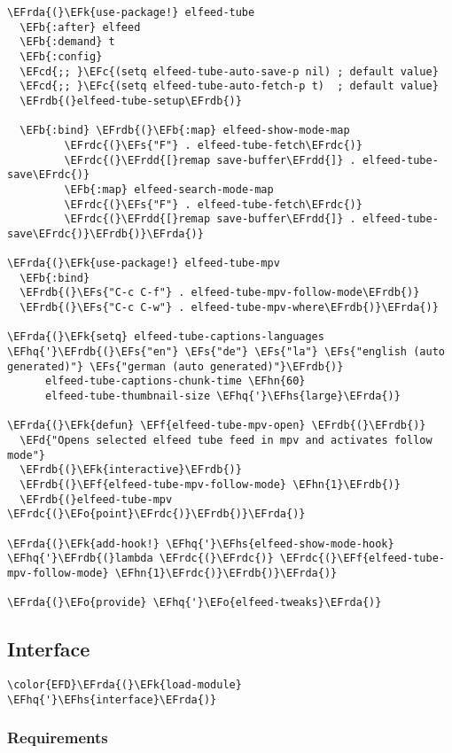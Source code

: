 \documentclass[a4wide,10pt]{article}
\newcommand{\EFc}[1]{\textcolor{EFc}{#1}} %
\newcommand{\EFcd}[1]{\textcolor{EFcd}{#1}} %
\newcommand{\EFs}[1]{\textcolor{EFs}{#1}} %
\newcommand{\EFd}[1]{\textcolor{EFd}{#1}} %
\newcommand{\EFk}[1]{\textcolor{EFk}{#1}} %
\newcommand{\EFb}[1]{\textcolor{EFb}{#1}} %
\newcommand{\EFf}[1]{\textcolor{EFf}{#1}} %
\newcommand{\EFo}[1]{\textcolor{EFo}{#1}} %
\newcommand{\EFhn}[1]{\textcolor{EFhn}{\textbf{#1}}} %
\newcommand{\EFhq}[1]{\textcolor{EFhq}{#1}} %
\newcommand{\EFhs}[1]{\textcolor{EFhs}{#1}} %
\newcommand{\EFrda}[1]{\textcolor{EFrda}{#1}} %
\newcommand{\EFrdb}[1]{\textcolor{EFrdb}{#1}} %
\newcommand{\EFrdc}[1]{\textcolor{EFrdc}{#1}} %
\newcommand{\EFrdd}[1]{\textcolor{EFrdd}{#1}} %
\begin{document}
\begin{Code}
\begin{Verbatim}
\EFrda{(}\EFk{use-package!} elfeed-tube
  \EFb{:after} elfeed
  \EFb{:demand} t
  \EFb{:config}
  \EFcd{;; }\EFc{(setq elfeed-tube-auto-save-p nil) ; default value}
  \EFcd{;; }\EFc{(setq elfeed-tube-auto-fetch-p t)  ; default value}
  \EFrdb{(}elfeed-tube-setup\EFrdb{)}

  \EFb{:bind} \EFrdb{(}\EFb{:map} elfeed-show-mode-map
         \EFrdc{(}\EFs{"F"} . elfeed-tube-fetch\EFrdc{)}
         \EFrdc{(}\EFrdd{[}remap save-buffer\EFrdd{]} . elfeed-tube-save\EFrdc{)}
         \EFb{:map} elfeed-search-mode-map
         \EFrdc{(}\EFs{"F"} . elfeed-tube-fetch\EFrdc{)}
         \EFrdc{(}\EFrdd{[}remap save-buffer\EFrdd{]} . elfeed-tube-save\EFrdc{)}\EFrdb{)}\EFrda{)}

\EFrda{(}\EFk{use-package!} elfeed-tube-mpv
  \EFb{:bind}
  \EFrdb{(}\EFs{"C-c C-f"} . elfeed-tube-mpv-follow-mode\EFrdb{)}
  \EFrdb{(}\EFs{"C-c C-w"} . elfeed-tube-mpv-where\EFrdb{)}\EFrda{)}

\EFrda{(}\EFk{setq} elfeed-tube-captions-languages \EFhq{'}\EFrdb{(}\EFs{"en"} \EFs{"de"} \EFs{"la"} \EFs{"english (auto generated)"} \EFs{"german (auto generated)"}\EFrdb{)}
      elfeed-tube-captions-chunk-time \EFhn{60}
      elfeed-tube-thumbnail-size \EFhq{'}\EFhs{large}\EFrda{)}

\EFrda{(}\EFk{defun} \EFf{elfeed-tube-mpv-open} \EFrdb{(}\EFrdb{)}
  \EFd{"Opens selected elfeed tube feed in mpv and activates follow mode"}
  \EFrdb{(}\EFk{interactive}\EFrdb{)}
  \EFrdb{(}\EFf{elfeed-tube-mpv-follow-mode} \EFhn{1}\EFrdb{)}
  \EFrdb{(}elfeed-tube-mpv \EFrdc{(}\EFo{point}\EFrdc{)}\EFrdb{)}\EFrda{)}

\EFrda{(}\EFk{add-hook!} \EFhq{'}\EFhs{elfeed-show-mode-hook} \EFhq{'}\EFrdb{(}lambda \EFrdc{(}\EFrdc{)} \EFrdc{(}\EFf{elfeed-tube-mpv-follow-mode} \EFhn{1}\EFrdc{)}\EFrdb{)}\EFrda{)}

\EFrda{(}\EFo{provide} \EFhq{'}\EFo{elfeed-tweaks}\EFrda{)}
\end{Verbatim}
\end{Code}

\subsection{Interface}
\label{sec:orgfc14a06}
\begin{Code}
\begin{Verbatim}
\color{EFD}\EFrda{(}\EFk{load-module} \EFhq{'}\EFhs{interface}\EFrda{)}
\end{Verbatim}
\end{Code}
\subsubsection{Requirements}
\label{sec:org3a1834b}
\end{document}

